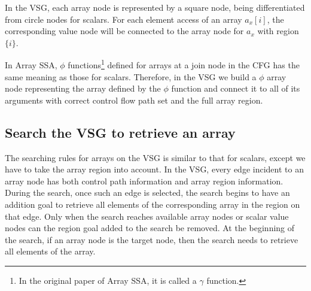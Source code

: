 \documentclass[12pt]{gatech-thesis}
\begin{document}

In the VSG, each array node is represented by a square node, being differentiated from circle nodes for scalars. 
For each element access of an array $a_x[i]$, the corresponding value node will be connected to the array node for $a_x$ with region $\{i\}$.

In Array SSA,  $\phi$ functions\footnote{In the original paper of Array SSA, it is called a $\gamma$ function.} defined for arrays at a join node in the CFG has the same meaning as those for scalars.
Therefore, in the VSG we build a $\phi$ array node representing the array defined by the $\phi$ function and connect it to all of its arguments with correct control flow path set and  the full array region. 







\subsection{Search the VSG to retrieve an array}

The searching rules for arrays on the VSG is similar to that for scalars, except we have to take the array region into account.
In the VSG, every edge incident to an array node has both control path information and array region information. 
During the search, once such an edge is selected, the search begins to have an addition goal to retrieve all elements of the corresponding array in the region on that edge.
Only when the search reaches available array nodes or scalar value nodes can the region goal added to the search be removed.
At the beginning of the search, if an array node is the target node, then the search needs to retrieve all elements of the array.
\end{document}
